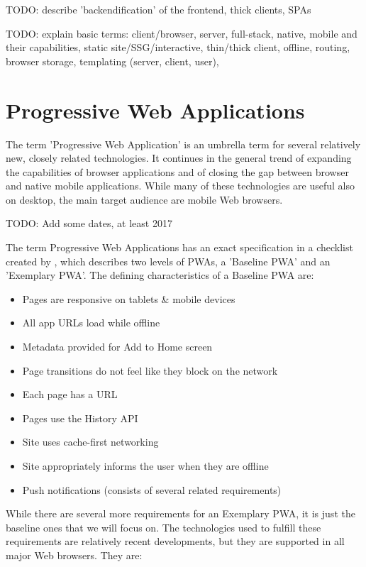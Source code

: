 \documentclass[english,odsaz]{fitthesis}
\begin{document}
TODO: describe 'backendification' of the frontend, thick clients, SPAs

TODO: explain basic terms: client/browser, server, full-stack, native, mobile
and their capabilities, static site/SSG/interactive, thin/thick client, offline,
routing, browser storage, templating (server, client, user),

\section{Progressive Web Applications}
\label{sec:org4ddec48}
The term 'Progressive Web Application' is an umbrella term for several
relatively new, closely related technologies. It continues in the general trend
of expanding the capabilities of browser applications and of closing the gap
between browser and native mobile applications. While many of these technologies
are useful also on desktop, the main target audience are mobile Web browsers.

TODO: Add some dates, at least 2017

The term Progressive Web Applications has an exact specification in a checklist
created by \cite{pwa_checklist}, which describes two levels of PWAs, a 'Baseline
PWA' and an 'Exemplary PWA'. The defining characteristics of a Baseline PWA are:

\begin{itemize}
\item Pages are responsive on tablets \& mobile devices
\item All app URLs load while offline
\item Metadata provided for Add to Home screen
\item Page transitions do not feel like they block on the network
\item Each page has a URL
\item Pages use the History API
\item Site uses cache-first networking
\item Site appropriately informs the user when they are offline
\item Push notifications (consists of several related requirements)
\end{itemize}

While there are several more requirements for an Exemplary PWA, it is just the
baseline ones that we will focus on. The technologies used to fulfill these
requirements are relatively recent developments, but they are supported in all
major Web browsers. They are:
\end{document}

